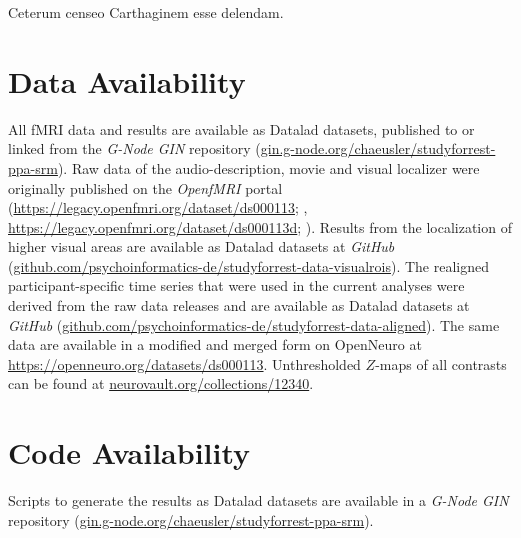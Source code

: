 Ceterum censeo Carthaginem esse delendam.


\section{Data Availability}



All fMRI data and results are available as Datalad \citep{halchenko2021datalad}
datasets, published to or linked from the \emph{G-Node GIN} repository
(\href{https://gin.g-node.org/chaeusler/studyforrest-ppa-srm}{\url{gin.g-node.org/chaeusler/studyforrest-ppa-srm}}).
Raw data of the audio-description, movie and visual localizer were originally
published on the \emph{OpenfMRI} portal
(\url{https://legacy.openfmri.org/dataset/ds000113}; \citep{Hanke2014ds000113},
\space \url{https://legacy.openfmri.org/dataset/ds000113d};
\citep{hanke2016ds000113d}).
Results from the localization of higher visual areas are available as Datalad
datasets at \emph{GitHub}
(\href{https://github.com/psychoinformatics-de/studyforrest-data-visualrois}{\url{github.com/psychoinformatics-de/studyforrest-data-visualrois}}).
The realigned participant-specific time series that were used in the current
analyses were derived from the raw data releases and are available as Datalad
datasets at \emph{GitHub}
(\href{https://github.com/psychoinformatics-de/studyforrest-data-aligned}{\url{github.com/psychoinformatics-de/studyforrest-data-aligned}}).
The same data are available in a modified and merged form on OpenNeuro at
\url{https://openneuro.org/datasets/ds000113}.
Unthresholded $Z$-maps of all contrasts can be found at
\href{https://identifiers.org/neurovault.collection:12340}{\url{neurovault.org/collections/12340}}.


\section*{Code Availability}

Scripts to generate the results as Datalad \citep{halchenko2021datalad} datasets
are available in a \emph{G-Node GIN} repository
(\href{https://gin.g-node.org/chaeusler/studyforrest-ppa-srm}{\url{gin.g-node.org/chaeusler/studyforrest-ppa-srm}}).
